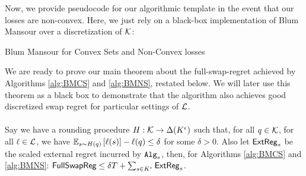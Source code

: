 Now, we provide pseudocode for our algorithmic template in the event that our losses are non-convex.  Here, we just rely on a black-box implementation of Blum Mansour over a discretization of $\mathcal{K}$:

\begin{algorithm}
\caption{Blum Mansour for Convex Sets and Non-Convex losses}
\label{alg:BMNS}


\end{algorithm}

We are ready to prove our main theorem about the full-swap-regret achieved by Algorithms \ref{alg:BMCS} and \ref{alg:BMNS}, restated below.  We will later use this theorem as a black box to demonstrate that the algorithm also achieves good discretized swap regret for particular settings of $\mathcal{L}$.
















\paragraph{} Say we have a rounding procedure $H: \mathcal{K} \to \Delta(K^{\epsilon})$ such that, for all $q \in \mathcal{K}$, for all $\ell \in \mathcal{L}$, we have
    $\mathbb{E}_{s \sim H(q)}\left[\ell(s)\right] - \ell(q) \leq \delta$
    for some $\delta>0$.  Also let $\operatorname{\mathsf{ExtReg}}_s$ be the scaled external regret incurred by $\mathtt{Alg}_s$, then, for Algorithms \ref{alg:BMCS} and \ref{alg:BMNS}: $\mathsf{FullSwapReg} \leq \delta T + \sum_{s \in K^{\epsilon}} \operatorname{\mathsf{ExtReg}}_s$. 



